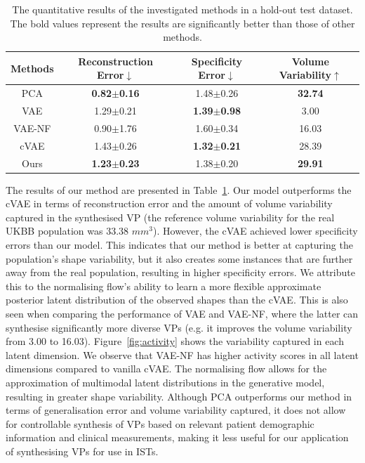 \documentclass[runningheads]{llncs}
\begin{document}
\begin{table}[ht]
\centering
\caption{The quantitative results of the investigated methods in a hold-out test dataset. The bold values represent the results are significantly better than those of other methods.}
\label{tab:quantitative}
\begin{tabular}{c|c|c|c}
\hline
\hline
Methods &Reconstruction Error$\downarrow$ &Specificity Error$\downarrow$ &Volume Variability$\uparrow$ \\
\hline
PCA  & \textbf{0.82$\pm$0.16} &1.48$\pm$0.26  &\textbf{32.74}        \\
VAE  & 1.29$\pm$0.21 &\textbf{1.39$\pm$0.98}  &3.00         \\
VAE-NF &0.90$\pm$1.76&1.60$\pm$0.34  &16.03           \\
\hline
cVAE &1.43$\pm$0.26 &\textbf{1.32$\pm$0.21} &28.39      \\
Ours &\textbf{1.23$\pm$0.23} &1.38$\pm$0.20 &\textbf{29.91}      \\
\hline
\hline
\end{tabular}
\end{table}
The results of our method are presented in Table~\ref{tab:quantitative}. Our model outperforms the cVAE in terms of reconstruction error and the amount of volume variability captured in the synthesised VP (the reference volume variability for the real UKBB population was 33.38 $mm^3$). However, the cVAE achieved lower specificity errors than our model. This indicates that our method is better at capturing the population's shape variability, but it also creates some instances that are further away from the real population, resulting in higher specificity errors. We attribute this to the normalising flow's ability to learn a more flexible approximate posterior latent distribution of the observed shapes than the cVAE. This is also seen when comparing the performance of VAE and VAE-NF, where the latter can synthesise significantly more diverse VPs (e.g. it improves the volume variability from 3.00 to 16.03). Figure~\ref{fig:activity} shows the variability captured in each latent dimension. We observe that VAE-NF has higher activity scores in all latent dimensions compared to vanilla cVAE. The normalising flow allows for the approximation of multimodal latent distributions in the generative model, resulting in greater shape variability. Although PCA outperforms our method in terms of generalisation error and volume variability captured, it does not allow for controllable synthesis of VPs based on relevant patient demographic information and clinical measurements, making it less useful for our application of synthesising VPs for use in ISTs.
\end{document}
